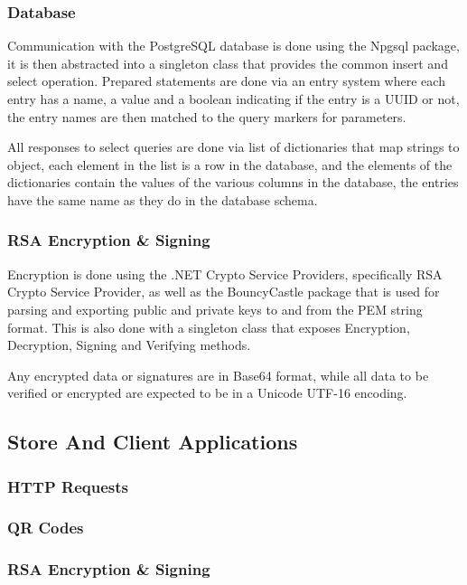 \documentclass[12pt]{article}
\begin{document}
\subsubsection{Database}
Communication with the PostgreSQL database is done using the Npgsql package, it is then abstracted into a singleton class that provides the common insert and select operation. Prepared
statements are done via an entry system where each entry has a name, a value and a boolean indicating if the entry is a UUID or not, the entry names are then matched to the
query markers for parameters.

All responses to select queries are done via list of dictionaries that map strings to object, each element in the list is a row in the database, and the elements of the dictionaries
contain the values of the various columns in the database, the entries have the same name as they do in the database schema.

\subsubsection{RSA Encryption \& Signing}
Encryption is done using the .NET Crypto Service Providers, specifically RSA Crypto Service Provider, as well as the BouncyCastle package that is used for parsing and exporting public and private
keys to and from the PEM string format. This is also done with a singleton class that exposes Encryption, Decryption, Signing and Verifying methods.

Any encrypted data or signatures are in Base64 format, while all data to be verified or encrypted are expected to be in a Unicode UTF-16 encoding.

\subsection{Store And Client Applications}

\subsubsection{HTTP Requests}

\subsubsection{QR Codes}

\subsubsection{RSA Encryption \& Signing}
\end{document}
